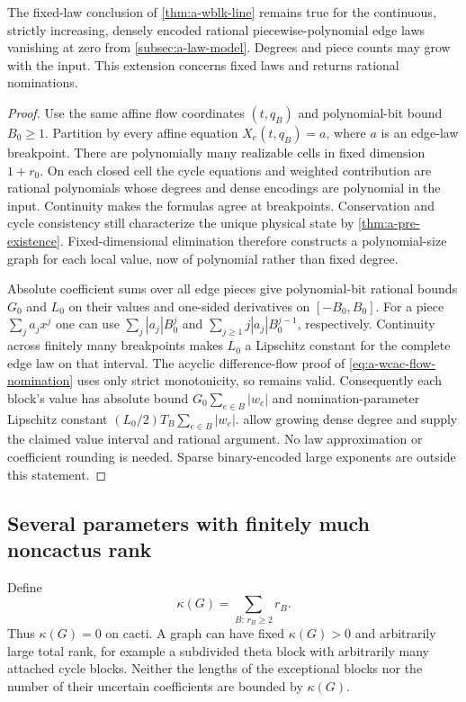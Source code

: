 \begin{corollary}
\label{cor:a-wblk-line-polynomial}
The fixed-law conclusion of \cref{thm:a-wblk-line} remains true for the
continuous, strictly increasing, densely encoded rational
piecewise-polynomial edge laws vanishing at zero from
\cref{subsec:a-law-model}. Degrees and piece counts may grow with the
input. This extension concerns fixed laws and returns rational nominations.
\end{corollary}
\begin{proof}
Use the same affine flow coordinates $(t,q_B)$ and polynomial-bit bound
$B_0\ge1$. Partition by every affine equation $X_e(t,q_B)=a$, where $a$
is an edge-law breakpoint. There are polynomially many realizable cells
in fixed dimension $1+r_0$. On each closed cell the cycle equations and
weighted contribution are rational polynomials whose degrees and dense
encodings are polynomial in the input. Continuity makes the formulas
agree at breakpoints. Conservation and cycle consistency still characterize
the unique physical state by \cref{thm:a-pre-existence}. Fixed-dimensional
elimination therefore constructs a polynomial-size graph for each local
value, now of polynomial rather than fixed degree.

Absolute coefficient sums over all edge pieces give polynomial-bit
rational bounds $G_0$ and $L_0$ on their values and one-sided derivatives
on $[-B_0,B_0]$. For a piece $\sum_j a_jx^j$ one can use
$\sum_j|a_j|B_0^j$ and $\sum_{j\ge1}j|a_j|B_0^{j-1}$, respectively.
Continuity across finitely many breakpoints makes $L_0$ a Lipschitz
constant for the complete edge law on that interval. The acyclic
difference-flow proof of \eqref{eq:a-wcac-flow-nomination} uses only
strict monotonicity, so remains valid. Consequently each block's value
has absolute bound $G_0\sum_{e\in B}|w_e|$ and nomination-parameter
Lipschitz constant $(L_0/2)T_B\sum_{e\in B}|w_e|$.
 allow growing dense
degree and supply the claimed value interval and rational argument.
No law approximation or coefficient rounding is needed. Sparse
binary-encoded large exponents are outside this statement.
\end{proof}

\subsection{Several parameters with finitely much noncactus rank}

Define
\[
 \kappa(G)=\sum_{B:\,r_B\ge2}r_B.
\]
Thus $\kappa(G)=0$ on cacti. A graph can have fixed $\kappa(G)>0$ and
arbitrarily large total rank, for example a subdivided theta block with
arbitrarily many attached cycle blocks. Neither the lengths of the
exceptional blocks nor the number of their uncertain coefficients are
bounded by $\kappa(G)$.

